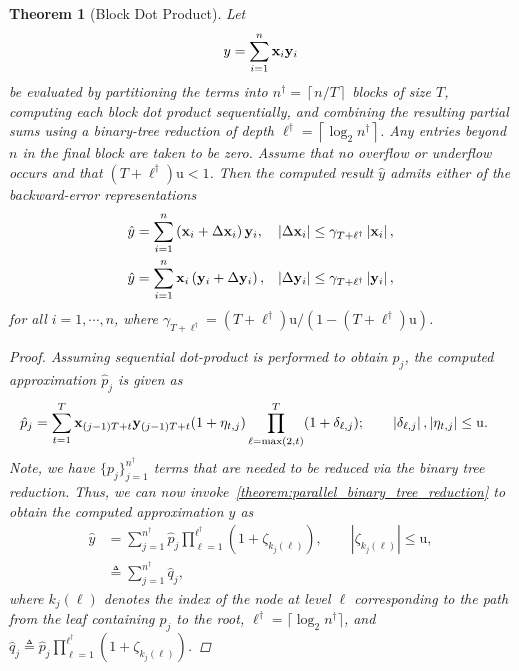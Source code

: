 \documentclass[11pt,draft]{article}
\newcommand{\urd}{\ensuremath{\mathrm{u}}}
\newcommand{\define}{\ensuremath{\triangleq}}
\newcommand{\vect}[1]{\mathbf{\MakeLowercase{#1}}}
\newtheorem{theorem}{Theorem}[section]
\theoremstyle{definition}
\theoremstyle{remark}
\newcommand{\abs}[1]{\left|#1\right|}
\newcommand{\ceil}[1]{\left\lceil #1 \right\rceil}
\begin{document}
\begin{theorem}[Block Dot Product]\label{theorem:block_dot_product}
Let
\begin{align}
    y=\sum_{i=1}^{n}\vect{x}_i\vect{y}_i
\end{align}
be evaluated by partitioning the terms into
$n^\dagger=\ceil{n/T}$ blocks of size $T$, computing each block dot
product sequentially, and combining the resulting partial sums using a
binary-tree reduction of depth
$\ell^\dagger=\ceil{\log_2 n^\dagger}$. Any entries beyond $n$ in the
final block are taken to be zero. Assume that no overflow or underflow
occurs and that $(T+\ell^\dagger)\urd<1$. Then the computed result
$\hat{y}$ admits either of the backward-error representations
\begin{align}
    \hat{y}
    &=\sum_{i=1}^{n}
      \left(\vect{x}_i+\Delta\vect{x}_i\right)\vect{y}_i,
    &
    \abs{\Delta\vect{x}_i}
    &\leq \gamma_{T+\ell^\dagger}\abs{\vect{x}_i},
    \\
    \hat{y}
    &=\sum_{i=1}^{n}
      \vect{x}_i\left(\vect{y}_i+\Delta\vect{y}_i\right),
    &
    \abs{\Delta\vect{y}_i}
    &\leq \gamma_{T+\ell^\dagger}\abs{\vect{y}_i},
\end{align}
for all $i=1,\cdots,n$, where
$\gamma_{T+\ell^\dagger}
=(T+\ell^\dagger)\urd/(1-(T+\ell^\dagger)\urd)$.
    \begin{proof}
    Assuming sequential dot-product is performed to obtain $p_j$, the computed approximation $\hat{p}_j$ is given as
    \begin{align}
        \hat{p}_j &= \sum_{t=1}^{T} \vect{x}_{(j-1)T + t} \vect{y}_{(j-1)T + t} (1 + \eta_{t,j}) \prod_{\ell=\max(2, t)}^{T} (1 + \delta_{\ell, j}); \qquad \abs{\delta_{\ell, j}}, \abs{\eta_{t,j}} \leq \urd.
    \end{align}
    Note, we have $\{p_j\}_{j=1}^{n^\dagger}$ terms that are needed to be reduced via the binary tree reduction.
    Thus, we can now invoke~\cref{theorem:parallel_binary_tree_reduction} to obtain the computed approximation $\hat{y}$ as 
    \begin{align}
        \hat{y} &= \sum_{j=1}^{n^\dagger} \hat{p}_j \prod_{\ell=1}^{\ell^\dagger} (1 + \zeta_{k_j(\ell)}), \qquad \abs{\zeta_{k_j(\ell)}} \leq \urd,\\
        &\define \sum_{j=1}^{n^\dagger} \hat{q}_j,
    \end{align}
    where $k_j(\ell)$ denotes the index of the node at level $\ell$ corresponding to the path from the leaf containing $p_j$ to the root, $\ell^\dagger = \lceil \log_2 n^\dagger \rceil$, and $\hat{q}_j\define \hat{p}_j \prod_{\ell=1}^{\ell^\dagger} (1 + \zeta_{k_j(\ell)})$.

\end{proof}
\end{theorem}
\end{document}
